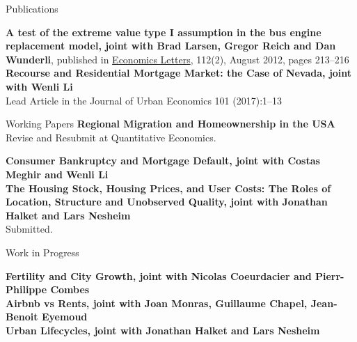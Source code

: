 \documentclass{cvjobmarket} %
\begin{document}
\newpage


\begin{rSection}{Publications}

{\textbf{A test of the extreme value type I assumption in the bus engine replacement model, joint with Brad Larsen, Gregor Reich and Dan Wunderli}, published in \href{http://www.sciencedirect.com/science/article/pii/S0165176512000870}{Economics Letters}, 112(2), August 2012, pages 213--216}\\ 


{\textbf{Recourse and Residential Mortgage Market: the Case of Nevada, joint with Wenli Li}} \\
{Lead Article in the Journal of Urban Economics 101 (2017):1–13}

\end{rSection}

\begin{rSection}{Working Papers}
{\textbf{Regional Migration and Homeownership in the USA}}\\
{Revise and Resubmit at Quantitative Economics.}

{\textbf{Consumer Bankruptcy and Mortgage Default, joint with Costas Meghir and Wenli Li}} \\


{\textbf{The Housing Stock, Housing Prices, and User Costs: The Roles of Location, Structure and Unobserved Quality, joint with Jonathan Halket and Lars Nesheim}} \\
{Submitted.}

\end{rSection}
\begin{rSection}{Work in Progress}

{\textbf{Fertility and City Growth, joint with Nicolas Coeurdacier and Pierr-Philippe Combes}} \\

{\textbf{Airbnb vs Rents, joint with Joan Monras, Guillaume Chapel, Jean-Benoit Eyemoud}} \\

{\textbf{Urban Lifecycles, joint with Jonathan Halket and Lars Nesheim}} \\

\end{rSection}
\end{document}
